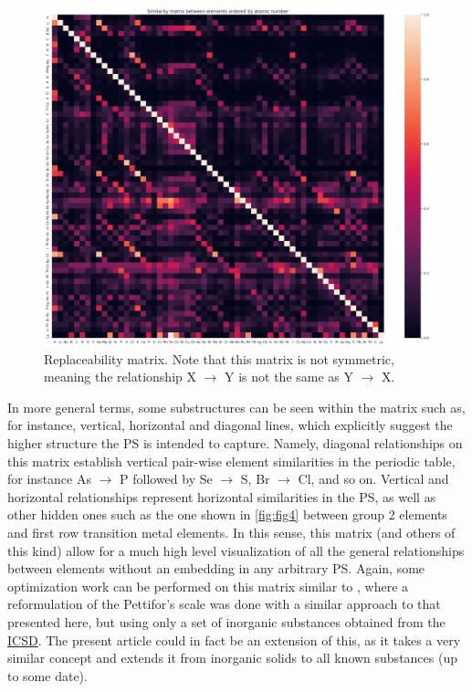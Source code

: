 \documentclass[]{article}
\begin{document}
\begin{figure}[h!]
  \centering
	\includegraphics[width=18.0cm]{matrix.png}
	\caption{Replaceability matrix. Note that this matrix is not symmetric, meaning the relationship X $\rightarrow$ Y is not the same as Y $\rightarrow$ X.}
	\label{fig:fig5}
\end{figure}

In more general terms, some substructures can be seen within the matrix such as, for instance, vertical, horizontal and diagonal lines, which explicitly suggest the higher structure the PS is intended to capture. Namely, diagonal relationships on this matrix establish vertical pair-wise element similarities in the periodic table, for instance As $\rightarrow$ P followed by Se $\rightarrow$ S, Br $\rightarrow$ Cl, and so on. Vertical and horizontal relationships represent horizontal similarities in the PS, as well as other hidden ones such as the one shown in \ref{fig:fig4} between group 2 elements and first row transition metal elements. In this sense, this matrix (and others of this kind) allow for a much high level visualization of all the general relationships between elements without an embedding in any arbitrary PS. Again, some optimization work can be performed on this matrix similar to \cite{Glawe_2016}, where a reformulation of the Pettifor's scale was done with a similar approach to that presented here, but using only a set of inorganic substances obtained from the \href{https://ucsd.libguides.com/crystallography/icsd}{ICSD}. The present article could in fact be an extension of this, as it takes a very similar concept and extends it from inorganic solids to all known substances (up to some date).



\renewcommand\refname{References}


\end{document}
